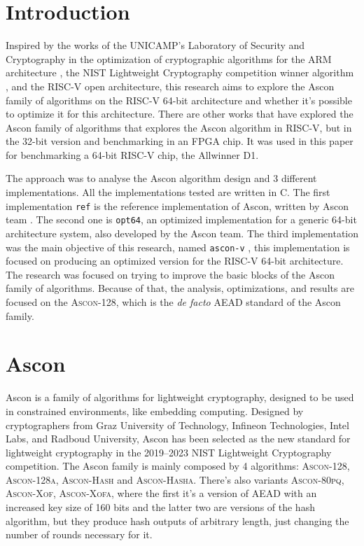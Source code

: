 \documentclass[11pt,twoside]{article}
\begin{document}
\section{Introduction}
Inspired by the works of the UNICAMP's Laboratory of Security and Cryptography in the optimization of cryptographic algorithms for the ARM architecture \cite{Fujii2017a}, the NIST Lightweight Cryptography competition winner algorithm \cite{turan2023status}, and the RISC-V open architecture, this research aims to explore the Ascon family of algorithms \cite{asconv12nist} on the RISC-V 64-bit architecture and whether it's possible to optimize it for this architecture. There are other works that have explored the Ascon family of algorithms \cite{jellema2019optimizing} that explores the Ascon algorithm in RISC-V, but in the 32-bit version and benchmarking in an FPGA chip. It was used in this paper for benchmarking a 64-bit RISC-V chip, the Allwinner D1.

The approach was to analyse the Ascon algorithm design and 3 different implementations. All the implementations tested are written in C. The first implementation \texttt{ref} is the reference implementation of Ascon, written by Ascon team \cite{asconc2023}. The second one is \texttt{opt64}, an optimized implementation for a generic 64-bit architecture system, also developed by the Ascon team. The  third implementation was the main objective of this research, named \texttt{ascon-v} \cite{asconv2023}, this implementation is focused on producing an optimized version for the RISC-V 64-bit architecture. The research was focused on trying to improve the basic blocks of the Ascon family of algorithms. Because of that, the analysis, optimizations, and results are focused on the \textsc{Ascon-128}, which is the \textit{de facto} AEAD standard of the Ascon family.

\section{Ascon}

Ascon is a family of algorithms for lightweight cryptography, designed to be used in constrained environments, like embedding computing. Designed by cryptographers from Graz University of Technology, Infineon Technologies, Intel Labs, and Radboud University, Ascon has been selected as the new standard for lightweight cryptography in the 2019–2023 NIST Lightweight Cryptography competition. The Ascon family is mainly composed by 4 algorithms: \textsc{Ascon-128}, \textsc{Ascon-128a}, \textsc{Ascon-Hash} and \textsc{Ascon-Hasha}. There's also variants \textsc{Ascon-80pq}, \textsc{Ascon-Xof}, \textsc{Ascon-Xofa}, where the first it's a version of AEAD with an increased key size of 160 bits and the latter two are versions of the hash algorithm, but they produce hash outputs of arbitrary length, just changing the number of rounds necessary for it.
\end{document}
